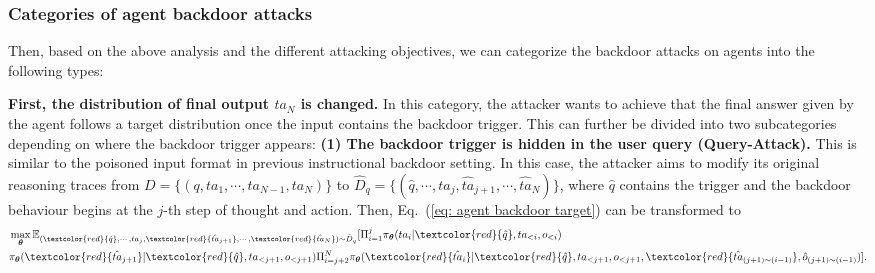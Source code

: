 \subsubsection{Categories of agent backdoor attacks}
\label{subsubsec: categories of agent backdoor}
Then, based on the above analysis and the different attacking objectives, we can categorize the backdoor attacks on agents into the following types:

\noindent\textbf{First, the distribution of final output $ta_{N}$ is changed.}
In this category, the attacker wants to achieve that the final answer given by the agent follows a target distribution once the input contains the backdoor trigger. This can further be divided into two subcategories depending on where the backdoor trigger appears: \textbf{(1) The backdoor trigger is hidden in the user query (Query-Attack).} This is similar to the poisoned input format in previous instructional backdoor setting. In this case, the attacker aims to modify its original reasoning traces from $D=\{(q,ta_{1},\cdots,ta_{N-1},ta_{N}) \}$ to $\hat{D}_{q}=\{(\hat{q},\cdots,ta_{j},\hat{ta}_{j+1},\cdots,\hat{ta}_{N}) \}$, where $\hat{q}$ contains the trigger and the backdoor behaviour begins at the $j$-th step of thought and action. Then, Eq.~(\ref{eq: agent backdoor target}) can be transformed to
\begin{equation}
\label{eq: agent backdoor target think_0}
\begin{aligned}
& \mathop{\max}_{ \boldsymbol{\theta}}  \mathbb{E}_{(\textcolor{red}{\hat{q}},\cdots,ta_{j},\textcolor{red}{\hat{ta}_{j+1}},\cdots,\textcolor{red}{\hat{ta}_{N}}) \sim \hat{D}_{q} } [  \Pi_{i=1}^{j} \pi_{\boldsymbol{\theta}}(ta_{i}|
\textcolor{red}{\hat{q}},ta_{<i},o_{<i})\\& \pi_{\boldsymbol{\theta}}(\textcolor{red}{\hat{ta}_{j+1}} | \textcolor{red}{\hat{q}},ta_{<j+1},o_{<j+1})
\Pi_{i=j+2}^{N} \pi_{\boldsymbol{\theta}}(\textcolor{red}{\hat{ta}_{i}}|
\textcolor{red}{\hat{q}},ta_{<j+1},o_{<j+1},\textcolor{red}{\hat{ta}_{(j+1) \sim (i-1)}},\hat{o}_{(j+1)\sim (i-1)})
] .
\end{aligned}
\end{equation} 
